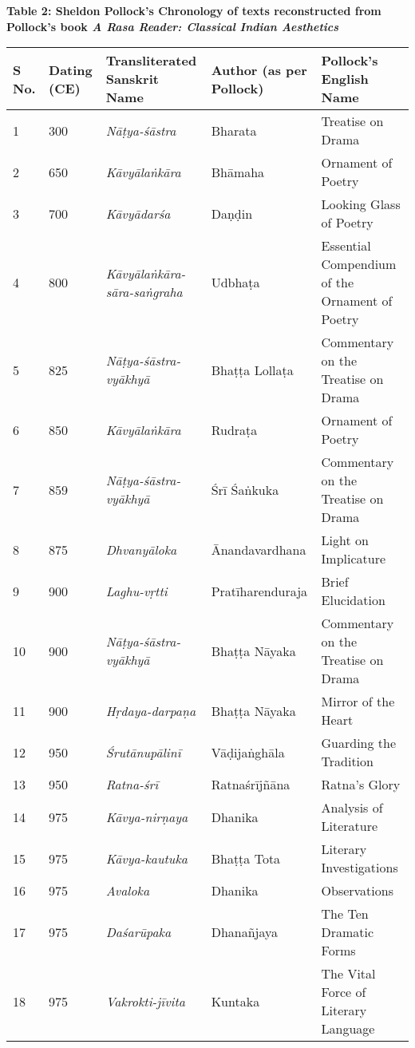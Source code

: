 \textbf{Table 2: Sheldon Pollock’s Chronology of texts reconstructed from Pollock’s book \textit{A Rasa Reader: Classical Indian Aesthetics}}

\begin{longtable}{|l|l|l|l|l|}
\hline
S No. & Dating (CE) & Transliterated Sanskrit Name & Author (as per Pollock) & Pollock’s English Name \\
\hline
1 & 300 & \textit{Nāṭya-śāstra} & Bharata & Treatise on Drama \\
\hline
2 & 650 & \textit{Kāvyālaṅkāra} & Bhāmaha & Ornament of Poetry \\
\hline
3 & 700 & \textit{Kāvyādarśa} & Daṇḍin & Looking Glass of Poetry \\
\hline
4 & 800 & \textit{Kāvyālaṅkāra-sāra-saṅgraha} & Udbhaṭa & Essential Compendium of the Ornament of Poetry \\
\hline
5 & 825 & \textit{Nāṭya-śāstra-vyākhyā} & Bhaṭṭa Lollaṭa & Commentary on the Treatise on Drama \\
\hline
6 & 850 & \textit{Kāvyālaṅkāra} & Rudraṭa & Ornament of Poetry \\
\hline
7 & 859 & \textit{Nāṭya-śāstra-vyākhyā} & Śrī Śaṅkuka & Commentary on the Treatise on Drama \\
\hline
8 & 875 & \textit{Dhvanyāloka} & Ānandavardhana & Light on Implicature \\
\hline
9 & 900 & \textit{Laghu-vṛtti} & Pratīharenduraja & Brief Elucidation \\
\hline
10 & 900 & \textit{Nāṭya-śāstra-vyākhyā} & Bhaṭṭa Nāyaka & Commentary on the Treatise on Drama \\
\hline
11 & 900 & \textit{Hṛdaya-darpaṇa} & Bhaṭṭa Nāyaka & Mirror of the Heart \\
\hline
12 & 950 & \textit{Śrutānupālinī} & Vāḍijaṅghāla & Guarding the Tradition \\
\hline
13 & 950 & \textit{Ratna-śrī} & Ratnaśrījñāna & Ratna’s Glory \\
\hline
14 & 975 & \textit{Kāvya-nirṇaya} & Dhanika & Analysis of Literature \\
\hline
15 & 975 & \textit{Kāvya-kautuka} & Bhaṭṭa Tota & Literary Investigations \\
\hline
16 & 975 & \textit{Avaloka} & Dhanika & Observations \\
\hline
17 & 975 & \textit{Daśarūpaka} & Dhanañjaya & The Ten Dramatic Forms \\
\hline
18 & 975 & \textit{Vakrokti-jīvita} & Kuntaka & The Vital Force of Literary Language \\

\end{longtable}
